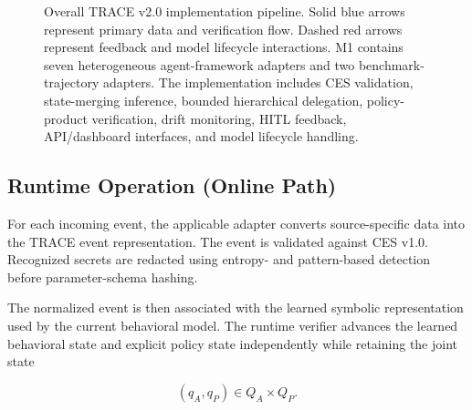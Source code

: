 \documentclass[11pt,a4paper]{article}
\begin{document}
\begin{figure}[!htbp]

\caption{Overall TRACE v2.0 implementation pipeline. Solid blue arrows represent
primary data and verification flow. Dashed red arrows represent feedback and model
lifecycle interactions. M1 contains seven heterogeneous agent-framework adapters and
two benchmark-trajectory adapters. The implementation includes CES validation,
state-merging inference, bounded hierarchical delegation, policy-product verification,
drift monitoring, HITL feedback, API/dashboard interfaces, and model lifecycle handling.}
\label{fig:pipeline}

\end{figure}

\subsection{Runtime Operation (Online Path)}

For each incoming event, the applicable adapter converts source-specific data into the
TRACE event representation. The event is validated against CES v1.0. Recognized secrets
are redacted using entropy- and pattern-based detection before parameter-schema hashing.

The normalized event is then associated with the learned symbolic representation used by
the current behavioral model. The runtime verifier advances the learned behavioral state
and explicit policy state independently while retaining the joint state

\[
(q_A,q_P) \in Q_A \times Q_P.
\]
\end{document}
